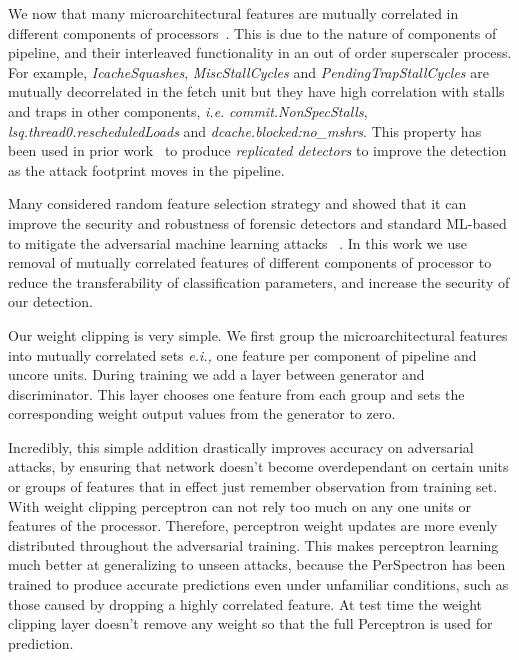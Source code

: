 We now that many microarchitectural features are mutually correlated in different components of processors~\cite{PerSpectron}. This is due to the nature of components of pipeline, and their interleaved functionality in an out of order superscaler process. For example, \textit{IcacheSquashes}, \textit{MiscStallCycles} and \textit{PendingTrapStallCycles} 
are mutually decorrelated in the fetch unit but they have high correlation with stalls 
and traps in other components, {\em i.e.} \textit{commit.NonSpecStalls}, 
\textit{lsq.thread0.rescheduledLoads} and \textit{dcache.blocked:no\_mshrs}. This property has been used in prior work~\cite{PerSpectron} to produce {\em replicated detectors} to improve the detection as the attack footprint moves in the pipeline.


Many considered random feature selection
strategy and showed that it can improve the security and robustness of forensic detectors and
standard ML-based to mitigate the adversarial machine learning attacks ~\cite{nowroozi2020survey, secureDetection2019}.
 In this work we use removal of mutually correlated features of different components of processor to reduce the transferability of classification parameters, and increase the security of our 
detection. 

Our weight clipping is very simple. We first group the microarchitectural features into mutually correlated sets {\em e.i.,} one feature per component of pipeline and uncore units. During training we add a layer between generator and discriminator. This layer chooses one feature from each group and sets the corresponding weight output values from the generator to zero.

Incredibly, this simple addition drastically improves accuracy on adversarial attacks, by ensuring that network doesn't become overdependant on certain units or groups of features that in effect just remember observation from training set. With weight clipping perceptron can not rely too much on any one units or features of the processor. Therefore, perceptron weight updates are more evenly distributed throughout the adversarial training. This makes perceptron learning much better at generalizing to unseen attacks, because the PerSpectron has been trained to produce accurate predictions even under unfamiliar conditions, such as those caused by dropping a highly correlated feature. At test time the weight clipping layer doesn't remove any weight so that the full Perceptron is used for prediction. 





